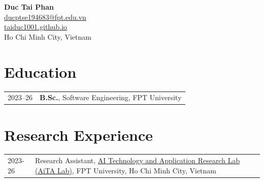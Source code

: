 \usepackage{xcolor}
\usepackage{hyperref}

\newcommand{\mytitle}[4]{
  \begin{center}
    \Large\textbf{#1}\normalsize \\
    \href{mailto:#2}{#2} \\
    \href{https://#3}{#3} \\
    #4
  \end{center}
}


\mytitle{Duc Tai Phan}{ducptse194683@fpt.edu.vn}{taiduc1001.github.io}{Ho Chi Minh City, Vietnam}

\RaggedRight

\setlength{\LTpre}{0pt}
\setlength{\LTpost}{2pt}

\section*{Education}
\vspace{-0.4em}
\begin{longtable}[l]{@{}p{} p{}}
  2023--26\footnotemark & \textbf{B.Sc.}, Software Engineering, FPT University \\
\end{longtable}


\renewcommand{\thefootnote}{\arabic{footnote}}
\setcounter{footnote}{1}

\vspace{-0.6em}
\section*{Research Experience}
\label{exp_research}
\vspace{-0.4em}
\begin{longtable}[l]{@{}p{} p{}}
  2023-26\footnotemark & Research Assistant, \href{https://aita-lab.github.io/}{AI Technology and Application Research Lab (AiTA Lab)}, FPT University, Ho Chi Minh City, Vietnam \\
\end{longtable}

